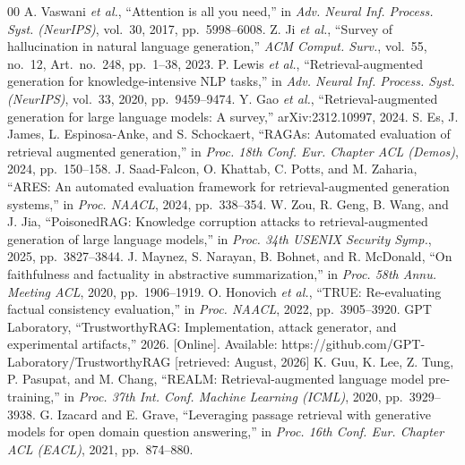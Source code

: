 \begin{thebibliography}{00}
 A. Vaswani \emph{et al.}, ``Attention is all you need,'' in \emph{Adv. Neural Inf. Process. Syst. (NeurIPS)}, vol.~30, 2017, pp.~5998--6008.
 Z. Ji \emph{et al.}, ``Survey of hallucination in natural language generation,'' \emph{ACM Comput. Surv.}, vol.~55, no.~12, Art.~no.~248, pp.~1--38, 2023.
 P. Lewis \emph{et al.}, ``Retrieval-augmented generation for knowledge-intensive NLP tasks,'' in \emph{Adv. Neural Inf. Process. Syst. (NeurIPS)}, vol.~33, 2020, pp.~9459--9474.
 Y. Gao \emph{et al.}, ``Retrieval-augmented generation for large language models: A survey,'' arXiv:2312.10997, 2024.
 S. Es, J. James, L. Espinosa-Anke, and S. Schockaert, ``RAGAs: Automated evaluation of retrieval augmented generation,'' in \emph{Proc. 18th Conf. Eur. Chapter ACL (Demos)}, 2024, pp.~150--158.
 J. Saad-Falcon, O. Khattab, C. Potts, and M. Zaharia, ``ARES: An automated evaluation framework for retrieval-augmented generation systems,'' in \emph{Proc. NAACL}, 2024, pp.~338--354.
 W. Zou, R. Geng, B. Wang, and J. Jia, ``PoisonedRAG: Knowledge corruption attacks to retrieval-augmented generation of large language models,'' in \emph{Proc. 34th USENIX Security Symp.}, 2025, pp.~3827--3844.
 J. Maynez, S. Narayan, B. Bohnet, and R. McDonald, ``On faithfulness and factuality in abstractive summarization,'' in \emph{Proc. 58th Annu. Meeting ACL}, 2020, pp.~1906--1919.
 O. Honovich \emph{et al.}, ``TRUE: Re-evaluating factual consistency evaluation,'' in \emph{Proc. NAACL}, 2022, pp.~3905--3920.
 GPT Laboratory, ``TrustworthyRAG: Implementation, attack generator, and experimental artifacts,'' 2026. [Online]. Available: https://github.com/GPT-Laboratory/TrustworthyRAG [retrieved: August, 2026]
 K. Guu, K. Lee, Z. Tung, P. Pasupat, and M. Chang, ``REALM: Retrieval-augmented language model pre-training,'' in \emph{Proc. 37th Int. Conf. Machine Learning (ICML)}, 2020, pp.~3929--3938.
 G. Izacard and E. Grave, ``Leveraging passage retrieval with generative models for open domain question answering,'' in \emph{Proc. 16th Conf. Eur. Chapter ACL (EACL)}, 2021, pp.~874--880.

\end{thebibliography}
